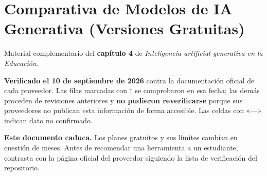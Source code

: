 \documentclass[a4paper,10pt]{article}
\begin{document}
\section*{Comparativa de Modelos de IA Generativa (Versiones Gratuitas)}

Material complementario del \textbf{capítulo 4} de \textit{Inteligencia artificial generativa en la Educación}.

\textbf{Verificado el 10 de septiembre de 2026} contra la documentación oficial de cada proveedor.
Las filas marcadas con $\dagger$ se comprobaron en esa fecha; las demás proceden de revisiones
anteriores y \textbf{no pudieron reverificarse} porque sus proveedores no publican esta información
de forma accesible. Las celdas con «---» indican dato no confirmado.

\textbf{Este documento caduca.} Los planes gratuitos y sus límites cambian en cuestión de meses.
Antes de recomendar una herramienta a un estudiante, contrasta con la página oficial del proveedor
siguiendo la lista de verificación del repositorio.

\vspace{0.4cm}
\end{document}

